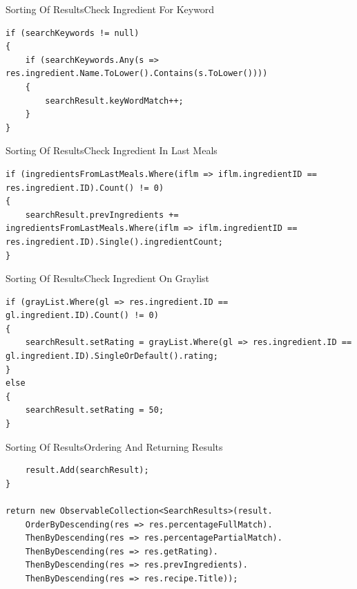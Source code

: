 \begin{frame}[fragile]{Sorting Of Results}{Check Ingredient For Keyword}
\begin{lstlisting}
if (searchKeywords != null)
{
    if (searchKeywords.Any(s => res.ingredient.Name.ToLower().Contains(s.ToLower())))
    {
        searchResult.keyWordMatch++;
    }
}
\end{lstlisting}
\end{frame}

\begin{frame}[fragile]{Sorting Of Results}{Check Ingredient In Last Meals}
\begin{lstlisting}
if (ingredientsFromLastMeals.Where(iflm => iflm.ingredientID == res.ingredient.ID).Count() != 0)
{
    searchResult.prevIngredients += ingredientsFromLastMeals.Where(iflm => iflm.ingredientID == res.ingredient.ID).Single().ingredientCount;
}
\end{lstlisting}
\end{frame}

\begin{frame}[fragile]{Sorting Of Results}{Check Ingredient On Graylist}
\begin{lstlisting}
if (grayList.Where(gl => res.ingredient.ID == gl.ingredient.ID).Count() != 0)
{
    searchResult.setRating = grayList.Where(gl => res.ingredient.ID == gl.ingredient.ID).SingleOrDefault().rating;
}
else
{
    searchResult.setRating = 50;
}
\end{lstlisting}
\end{frame}

\begin{frame}[fragile]{Sorting Of Results}{Ordering And Returning Results}
\begin{lstlisting}
    result.Add(searchResult);
}

return new ObservableCollection<SearchResults>(result.
    OrderByDescending(res => res.percentageFullMatch).
    ThenByDescending(res => res.percentagePartialMatch).
    ThenByDescending(res => res.getRating).
    ThenByDescending(res => res.prevIngredients).
    ThenByDescending(res => res.recipe.Title));
\end{lstlisting}
\end{frame}




















